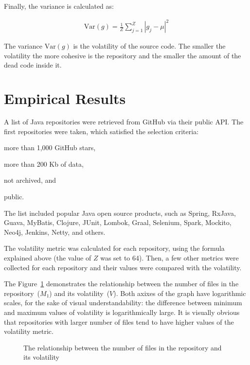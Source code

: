 \documentclass[sigconf]{acmart}
\begin{document}
Finally, the variance is calculated as:

\begin{eqnarray}
\text{Var}(g) = \frac{1}{Z}\sum_{j=1}^{Z}{|g_j - \mu|^2}
\end{eqnarray}

The variance $\text{Var}(g)$ is the volatility of the source code. The smaller
the volatility the more cohesive is the repository and the smaller
the amount of the dead code inside it.

\section{Empirical Results}
\label{sec:results}

A list of Java repositories were retrieved from GitHub via their
public API. The first \thetotalrepos{} repositories were taken, which satisfied
the selection criteria:
\begin{enumerate*}[label={\arabic*)}]
\item more than 1,000 GitHub stars,
\item more than 200 Kb of data,
\item not archived, and
\item public.
\end{enumerate*}
The list included popular Java open source products, such as
Spring, RxJava, Guava, MyBatis, Clojure, JUnit, Lombok,
Graal, Selenium, Spark, Mockito, Neo4j, Jenkins, Netty, and others.

The volatility metric was calculated for each repository, using the
formula explained above (the value of $Z$ was set to 64).
Then, a few other metrics were collected
for each repository and their values were compared with the volatility.

The Figure~\ref{fig:1} demonstrates the relationship between
the number of files in the repository~($M_1$) and its volatility~($V$). Both
axixes of the graph have logarithmic scales, for the sake of visual
understandability: the difference between minimum and maximum values
of volatility is logarithmically large. It is visually obvious that
repositories with larger number of files tend to have higher values
of the volatility metric.

\begin{figure}[h]
  
  \caption{The relationship between the number of files in the repository and its volatility}
  \label{fig:1}
\end{figure}
\end{document}
